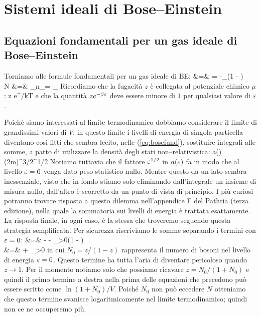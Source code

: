 \chapter{Sistemi ideali di Bose--Einstein}
\label{cap:bose}

\section{Equazioni fondamentali per un gas ideale di Bose--Einstein}

Torniamo alle formule fondamentali per un gas ideale di BE:
\bea
\label{eq:bosefund}
 &=& \ln\calQ = -\sum_\eps\ln\left(1 - \zembe\right) \nonumber\\
N              &=& \sum_\eps \langle n_\eps\rangle = \sum_\eps {}
\eea
Ricordiamo che la fugacità $z$ è collegata al potenziale chimico $\mu$:
\be
z \equiv e^{\mu/kT}
\ee
e che la quantità $ze^{-\beta\varepsilon}$ deve essere minore di $1$ per qualsiasi valore di $\varepsilon$.

Poiché siamo interessati al limite termodinamico dobbiamo considerare il limite di grandissimi valori di $V$; in questo limite i livelli di energia di singola particella diventano così fitti che sembra lecito, nelle (\ref{eq:bosefund}), sostituire integrali alle somme, a patto di utilizzare la densità degli stati non--relativistica:
\be
a(\eps)\de\eps = (2m)^{3/2}\eps^{1/2}\de\eps
\ee
Notiamo tuttavia che il fattore $\varepsilon^{1/2}$ in $a(\varepsilon)$ fa in modo che al livello $\varepsilon=0$ venga dato peso statistico nullo. Mentre questo da un lato sembra inessenziale, visto che in fondo stiamo solo eliminando dall'integrale un insieme di misura nullo, dall'altro è scorretto da un punto di vista di principio. I più curiosi potranno trovare risposta a questo dilemma nell'appendice F del Pathria (terza edizione), nella quale la sommatoria sui livelli di energia è trattata esattamente. La risposta finale, in ogni caso, è la stessa che troveremo seguendo questa strategia semplificata. Per sicurezza riscriviamo le somme separando i termini con $\varepsilon=0$:
\bea
{} &=& - - \sum_{\eps>0}\ln\left(1 - \zembe\right) \nonumber\\
  &=&  + \sum_{\eps>0}
\eea
in cui $N_0 = z/(1-z)$ rappresenta il numero di bosoni nel livello di energia $\varepsilon=0$. Questo termine ha tutta l'aria di diventare pericoloso quando $z\to 1$. Per il momento notiamo solo che possiamo ricavare $z = N_0/(1+N_0)$ e quindi il primo termine a destra nella prima delle equazioni che precedono può essere scritto come $\ln(1+N_0)/V$. Poiché $N_0$ non può eccedere $N$ otteniamo che questo termine svanisce logaritmicamente nel limite termodinamico; quindi non ce ne occuperemo più.

